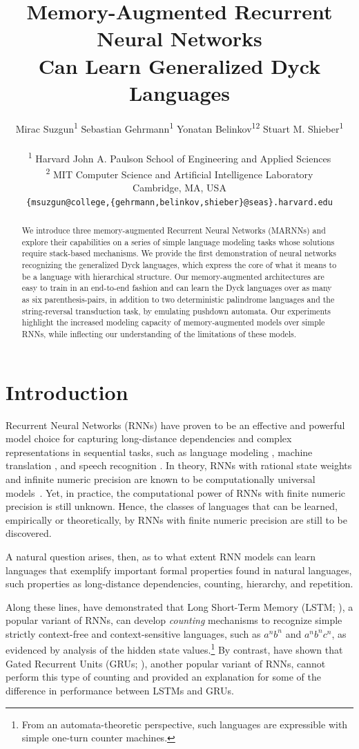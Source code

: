 \documentclass[11pt,a4paper]{article}
\title{Memory-Augmented Recurrent Neural Networks \\ Can Learn Generalized Dyck Languages}
\author{Mirac Suzgun\textsuperscript{1} \hfill Sebastian Gehrmann\textsuperscript{1} \hfill Yonatan Belinkov\textsuperscript{12} \hfill Stuart M. Shieber\textsuperscript{1} \\\\ 
  \textsuperscript{1} Harvard John A. Paulson School of Engineering and Applied Sciences \\  
  \textsuperscript{2} MIT Computer Science and Artificial Intelligence Laboratory \\ 
  Cambridge, MA, USA \\ 
  \texttt{\{msuzgun@college,\{gehrmann,belinkov,shieber\}@seas\}.harvard.edu} }
\date{}
\theoremstyle{plain}
\begin{document}
\maketitle

\begin{abstract}
We introduce three memory-augmented Recurrent Neural Networks (MARNNs) and explore their capabilities on a series of simple language modeling tasks whose solutions require stack-based mechanisms. We provide the first demonstration of neural networks recognizing the generalized Dyck languages, which express the core of what it means to be a language with hierarchical structure. Our memory-augmented architectures are easy to train in an end-to-end fashion and can learn the Dyck languages over as many as six parenthesis-pairs, in addition to two deterministic palindrome languages and the string-reversal transduction task, by emulating pushdown automata. Our experiments highlight the increased modeling capacity of memory-augmented models over simple RNNs, while inflecting our understanding of the limitations of these models. 
\end{abstract}

\section{Introduction}
Recurrent Neural Networks (RNNs) have proven to be an effective and powerful model choice for capturing long-distance dependencies and complex representations in sequential tasks, such as language modeling \citep{mikolov2010recurrent,Sundermeyer2012LSTMNN}, machine translation \citep{kalchbrenner2013recurrent, sutskever2014sequence,bahdanau2014neural}, and speech recognition \citep{graves2013speech}. In theory, RNNs with rational state weights and infinite numeric precision are known to be computationally universal models~\citep{siegelmann1994analog, siegelmann1995computational}. Yet, in practice, the computational power of RNNs with finite numeric precision is still unknown. Hence, the classes of languages that can be learned, empirically or theoretically, by RNNs with finite numeric precision are still to be discovered. 

A natural question arises, then, as to what extent RNN models can learn languages that exemplify important formal properties found in natural languages, such properties as long-distance dependencies, counting, hierarchy, and repetition. 

Along these lines, \citet{gers2001lstm, weiss2018practical, suzgun2019evaluating} have demonstrated that Long Short-Term Memory (LSTM; \citet{hochreiter1997long}), a popular variant of RNNs, can develop \emph{counting} mechanisms to recognize simple strictly context-free and context-sensitive languages, such as $a^n b^n$ and $a^n b^n c^n$, as evidenced by analysis of the hidden state values.\footnote{From an automata-theoretic perspective, such languages are expressible with simple one-turn counter machines.} By contrast, \citeauthor{weiss2018practical} have shown that Gated Recurrent Units (GRUs; \citet{cho2014learning}), another popular variant of RNNs, cannot perform this type of counting and provided an explanation for some of the difference in performance between LSTMs and GRUs. 
\end{document}
